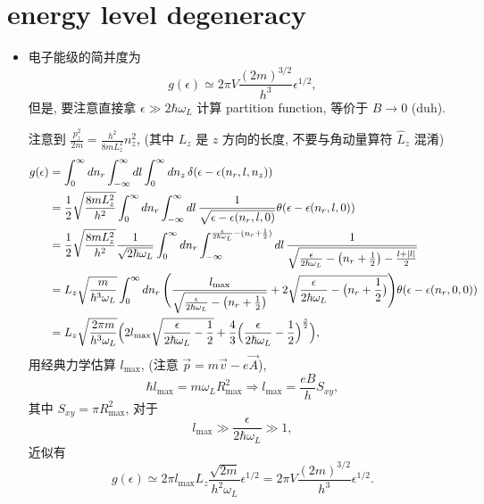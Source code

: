 \section{energy level degeneracy}
\begin{itemize}
	\item 电子能级的简并度为
	\begin{equation}
		g(\epsilon) \simeq 2 \pi V \frac{(2 m)^{3 / 2}}{h^3} \epsilon^{1 / 2},
	\end{equation}
	但是, 要注意直接拿 $\epsilon \gg 2 \hbar \omega_L$ 计算 partition function, 等价于 $B \rightarrow 0$ (duh).
	
	\begin{tcolorbox}[title=caculation:]
		注意到 $\frac{p_z^2}{2 m} = \frac{h^2}{8 m L_z^2} n_z^2$, (其中 $L_z$ 是 $z$ 方向的长度, 不要与角动量算符 $\hat{L}_z$ 混淆)
		\begin{align}
			g(\epsilon) &= \int_0^\infty dn_r \int_{- \infty}^\infty dl \int_0^\infty dn_z \, \delta(\epsilon - \epsilon(n_r, l, n_z)) \notag \\
			&= \frac{1}{2} \sqrt{\frac{8 m L_z^2}{h^2}} \int_0^\infty dn_r \int_{- \infty}^\infty dl \, \frac{1}{\sqrt{\epsilon - \epsilon(n_r, l, 0)}} \theta(\epsilon - \epsilon(n_r, l, 0)) \notag \\
			&= \frac{1}{2} \sqrt{\frac{8 m L_z^2}{h^2}} \frac{1}{\sqrt{2 \hbar \omega_L}} \int_0^\infty dn_r \int_{- \infty}^{\frac{\epsilon}{2 \hbar \omega_L} - (n_r + \frac{1}{2})} dl \, \frac{1}{\sqrt{\frac{\epsilon}{2 \hbar \omega_L} - \big( n_r + \frac{1}{2} \big) - \frac{l + |l|}{2}}} \notag \\
			&= L_z \sqrt{\frac{m}{\hbar^3 \omega_L}} \int_0^\infty dn_r \, \Bigg( \frac{l_\text{max}}{\sqrt{\frac{\epsilon}{2 \hbar \omega_L} - \big( n_r + \frac{1}{2} \big)}} + 2 \sqrt{\frac{\epsilon}{2 \hbar \omega_L} - \big( n_r + \frac{1}{2} \big)} \Bigg) \theta(\epsilon - \epsilon(n_r, 0, 0)) \notag \\
			&= L_z \sqrt{\frac{2 \pi m}{h^3 \omega_L}} \Big( 2 l_\text{max} \sqrt{\frac{\epsilon}{2 \hbar \omega_L} - \frac{1}{2}} + \frac{4}{3} \Big( \frac{\epsilon}{2 \hbar \omega_L} - \frac{1}{2} \Big)^{\frac{3}{2}} \Big),
		\end{align}
		用经典力学估算 $l_\text{max}$, (注意 $\vec{p} = m \vec{v} - e \vec{A}$),
		\begin{equation}
			\hbar l_\text{max} = m \omega_L R_\text{max}^2 \Longrightarrow l_\text{max} = \frac{e B}{h} S_{x y},
		\end{equation}
		其中 $S_{x y} = \pi R_\text{max}^2$, 对于
		\begin{equation}
			l_\text{max} \gg \frac{\epsilon}{2 \hbar \omega_L} \gg 1,
		\end{equation}
		近似有
		\begin{equation}
			g(\epsilon) \simeq 2 \pi l_\text{max} L_z \frac{\sqrt{2 m}}{h^2 \omega_L} \epsilon^{1 / 2} = 2 \pi V \frac{(2 m)^{3 / 2}}{h^3} \epsilon^{1 / 2}.
		\end{equation}
		

\end{tcolorbox}
\end{itemize}
